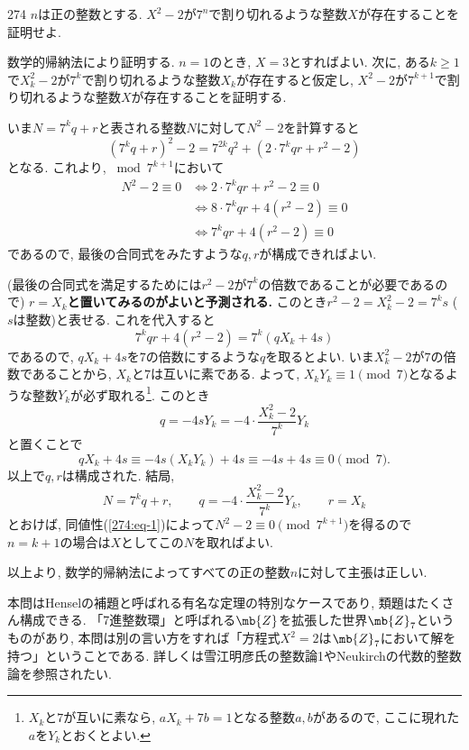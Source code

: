 \begin{prob}{274}{}{}
$n$は正の整数とする. $X^2-2$が$7^n$で割り切れるような整数$X$が存在することを証明せよ. 
\end{prob}

数学的帰納法により証明する. $n=1$のとき, $X=3$とすればよい. 次に, ある$k\geq 1$で$X_k^2 - 2$が$7^k$で割り切れるような整数$X_k$が存在すると仮定し, $X^2-2$が$7^{k+1}$で割り切れるような整数$X$が存在することを証明する. \par 
いま$N = 7^k q + r$と表される整数$N$に対して$N^2-2$を計算すると
\[
(7^k q+r)^2 - 2= 7^{2k} q^2 + (2\cdot 7^{k} qr + r^2 -2)
\]
となる. これより, $\bmod{7^{k+1}}$において
\begin{align}\label{274:eq-1}
N^2 - 2 \equiv 0 &\iff  2\cdot 7^k qr + r^2 - 2 \equiv 0 \\ \nonumber  
			&\iff 8\cdot 7^{k}qr + 4(r^2 - 2) \equiv 0 \\ \nonumber 
			&\iff 7^{k}qr + 4(r^2 - 2) \equiv 0 
\end{align} 
であるので, 最後の合同式をみたすような$q,r$が構成できればよい. \par
(最後の合同式を満足するためには$r^2-2$が$7^{k}$の倍数であることが必要であるので) \textbf{$r = X_k$と置いてみるのがよいと予測される.} このとき$r^2 - 2 = X_k^2 - 2 = 7^{k}s$ ($s$は整数)と表せる. これを代入すると
\[
7^{k} qr + 4(r^2 - 2) = 7^k(qX_k + 4s)
\]
であるので, $qX_k + 4s$を$7$の倍数にするような$q$を取るとよい. いま$X_{k}^2 - 2$が$7$の倍数であることから, $X_k$と$7$は互いに素である. よって, $X_kY_k \equiv 1\pmod{7}$となるような整数$Y_k$が必ず取れる\footnote{$X_k$と$7$が互いに素なら, $aX_k + 7b = 1$となる整数$a,b$があるので, ここに現れた$a$を$Y_k$とおくとよい. }. このとき
\[q = -4sY_k = -4\cdot \dfrac{X_k^2-2}{7^k}Y_k\]
と置くことで
\[
qX_k + 4s \equiv  -4s(X_kY_k) + 4s \equiv -4s + 4s \equiv 0\pmod{7}.
\]
以上で$q,r$は構成された. 結局,  
\[
N = 7^kq + r,\qquad q = -4\cdot \dfrac{X_k^2-2}{7^k}Y_k,\qquad r = X_k
\]
とおけば, 同値性(\ref{274:eq-1})によって$N^2 - 2\equiv 0\pmod{7^{k+1}}$を得るので$n=k+1$の場合は$X$としてこの$N$を取ればよい. \par 
以上より, 数学的帰納法によってすべての正の整数$n$に対して主張は正しい. 




\begin{supple}
本問はHenselの補題と呼ばれる有名な定理の特別なケースであり, 類題はたくさん構成できる. 「7進整数環」と呼ばれる$\mb{Z}$を拡張した世界$\mb{Z}_{7}$というものがあり, 本問は別の言い方をすれば「方程式$X^2 = 2$は$\mb{Z}_{7}$において解を持つ」ということである. 詳しくは雪江明彦氏の整数論1やNeukirchの代数的整数論を参照されたい. 
\end{supple}






